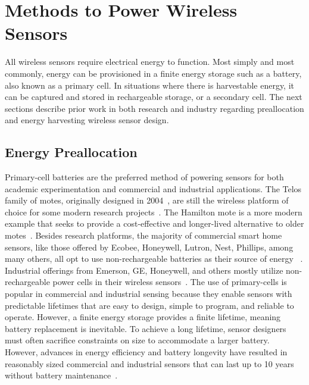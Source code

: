 
\section{Methods to Power Wireless Sensors}
\label{sec:background:methods}
All wireless sensors require electrical energy to function.
Most simply and most commonly, energy can be provisioned in a finite energy storage such as a battery, also known as a primary cell.
In situations where there is harvestable energy, it can be captured and stored in rechargeable storage, or a secondary cell.
The next sections describe prior work in both research and industry regarding preallocation and energy harvesting wireless sensor design.

\subsection{Energy Preallocation}
Primary-cell
batteries are the preferred
method of powering sensors for both academic experimentation
and commercial and industrial applications.
The Telos family of motes, originally designed in 2004~\cite{polastre2005telos},
are still the wireless platform of choice for some modern research projects~\cite{mohammad2018codecast,li2019privacy}.
The Hamilton mote is a more modern example that seeks to provide a cost-effective and longer-lived alternative to older motes~\cite{andersen2017hamilton}.
Besides research platforms, the majority of commercial smart home sensors, like those offered by Ecobee, Honeywell, Lutron, Nest, Phillips, among many others, all opt to use non-rechargeable batteries as their source of energy
~\cite{ecobeeSensor, honeywellThermostat, lutronSolutions, googleNestTemperature, hueSensor}.
Industrial offerings from Emerson, GE, Honeywell, and others mostly utilize non-rechargeable power cells in their wireless sensors~\cite{emersonRosemount,GEInsightMesh,honeywellOneWireless}.
The use of primary-cells is popular in commercial and industrial sensing because they enable sensors with predictable lifetimes that are easy to
design, simple to program, and reliable to operate.
However, a finite energy storage provides a finite lifetime, meaning battery replacement is inevitable.
To achieve a long lifetime, sensor designers must often sacrifice constraints on size to accommodate a larger battery.
However, advances in energy efficiency and battery longevity have resulted in reasonably sized commercial and industrial sensors that can last up to 10 years without battery maintenance~\cite{emersonRosemount,honeywellOneWireless, lutronSolutions}.

